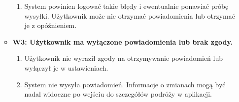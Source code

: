 \documentclass[a4paper,12pt]{article}
\begin{document}
\begin{itemize}
\begin{itemize}
\begin{enumerate}
\item System powinien logować takie błędy i ewentualnie ponawiać próbę wysyłki. Użytkownik może nie otrzymać powiadomienia lub otrzymać je z opóźnieniem.
\end{enumerate}
\item \textbf{W3: Użytkownik ma wyłączone powiadomienia lub brak zgody.}
\begin{enumerate}
\item Użytkownik nie wyraził zgody na otrzymywanie powiadomień lub wyłączył je w ustawieniach.
\item System nie wysyła powiadomień. Informacje o zmianach mogą być nadal widoczne po wejściu do szczegółów podróży w aplikacji.
\end{enumerate}
\end{itemize}
\end{itemize}
\end{document}

